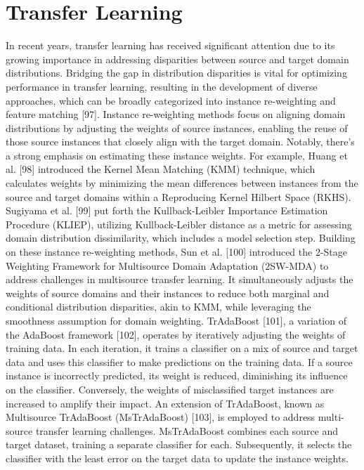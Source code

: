 \section{Transfer Learning} 
\label{sec:3_5_transfer_learning}
In recent years, transfer learning has received significant attention due to its growing importance in addressing disparities between source and target domain distributions. Bridging the gap in distribution disparities is vital for optimizing performance in transfer learning, resulting in the development of diverse approaches, which can be broadly categorized into instance re-weighting and feature matching [97]. Instance re-weighting methods focus on aligning domain distributions by adjusting the weights of source instances, enabling the reuse of those source instances that closely align with the target domain. Notably, there's a strong emphasis on estimating these instance weights. For example, Huang et al. [98] introduced the Kernel Mean Matching (KMM) technique, which calculates weights by minimizing the mean differences between instances from the source and target domains within a Reproducing Kernel Hilbert Space (RKHS). Sugiyama et al. [99] put forth the Kullback-Leibler Importance Estimation Procedure (KLIEP), utilizing Kullback-Leibler distance as a metric for assessing domain distribution dissimilarity, which includes a model selection step. Building on these instance re-weighting methods, Sun et al. [100] introduced the 2-Stage Weighting Framework for Multisource Domain Adaptation (2SW-MDA) to address challenges in multisource transfer learning. It simultaneously adjusts the weights of source domains and their instances to reduce both marginal and conditional distribution disparities, akin to KMM, while leveraging the smoothness assumption for domain weighting. TrAdaBoost [101], a variation of the AdaBoost framework [102], operates by iteratively adjusting the weights of training data. In each iteration, it trains a classifier on a mix of source and target data and uses this classifier to make predictions on the training data. If a source instance is incorrectly predicted, its weight is reduced, diminishing its influence on the classifier. Conversely, the weights of misclassified target instances are increased to amplify their impact. An extension of TrAdaBoost, known as Multisource TrAdaBoost (MsTrAdaBoost) [103], is employed to address multi-source transfer learning challenges. MsTrAdaBoost combines each source and target dataset, training a separate classifier for each. Subsequently, it selects the classifier with the least error on the target data to update the instance weights.
